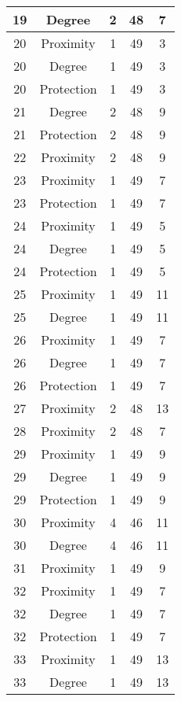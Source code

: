 \documentclass[results.tex]{subfiles}
\begin{document}
\begin{center}
\begin{tabular}{| c || c | c | c | c |}
    \hline
    19 & Degree & 2 & 48 & 7 \\ 
    \hline
    20 & Proximity & 1 & 49 & 3 \\ 
    \hline
    20 & Degree & 1 & 49 & 3 \\ 
    \hline
    20 & Protection & 1 & 49 & 3 \\ 
    \hline
    21 & Degree & 2 & 48 & 9 \\ 
    \hline
    21 & Protection & 2 & 48 & 9 \\ 
    \hline
    22 & Proximity & 2 & 48 & 9 \\ 
    \hline
    23 & Proximity & 1 & 49 & 7 \\ 
    \hline
    23 & Protection & 1 & 49 & 7 \\ 
    \hline
    24 & Proximity & 1 & 49 & 5 \\ 
    \hline
    24 & Degree & 1 & 49 & 5 \\ 
    \hline
    24 & Protection & 1 & 49 & 5 \\ 
    \hline
    25 & Proximity & 1 & 49 & 11 \\ 
    \hline
    25 & Degree & 1 & 49 & 11 \\ 
    \hline
    26 & Proximity & 1 & 49 & 7 \\ 
    \hline
    26 & Degree & 1 & 49 & 7 \\ 
    \hline
    26 & Protection & 1 & 49 & 7 \\ 
    \hline
    27 & Proximity & 2 & 48 & 13 \\ 
    \hline
    28 & Proximity & 2 & 48 & 7 \\ 
    \hline
    29 & Proximity & 1 & 49 & 9 \\ 
    \hline
    29 & Degree & 1 & 49 & 9 \\ 
    \hline
    29 & Protection & 1 & 49 & 9 \\ 
    \hline
    30 & Proximity & 4 & 46 & 11 \\ 
    \hline
    30 & Degree & 4 & 46 & 11 \\ 
    \hline
    31 & Proximity & 1 & 49 & 9 \\ 
    \hline
    32 & Proximity & 1 & 49 & 7 \\ 
    \hline
    32 & Degree & 1 & 49 & 7 \\ 
    \hline
    32 & Protection & 1 & 49 & 7 \\ 
    \hline
    33 & Proximity & 1 & 49 & 13 \\ 
    \hline
    33 & Degree & 1 & 49 & 13 \\ 
    \hline

\end{tabular}
\end{center}
\end{document}
